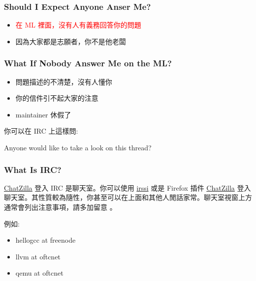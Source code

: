 \documentclass[CJK]{beamer}
\begin{document}
\begin{CJK}{UTF8}{bkai}
\begin{frame}
\end{frame}

\begin{frame}
  \frametitle{Should I Expect Anyone Anser Me?}

\begin{itemize}
  \item \textcolor{red}{在 ML 裡面，沒有人有義務回答你的問題}
  \item 因為大家都是志願者，你不是他老闆
\end{itemize}

\end{frame}

\begin{frame}
  \frametitle{What If Nobody Answer Me on the ML?}

\begin{itemize}
  \item 問題描述的不清楚，沒有人懂你
  \item 你的信件引不起大家的注意
  \item maintainer 休假了
\end{itemize}

\medskip
你可以在 IRC 上這樣問:

  Anyone would like to take a look on this thread?

\end{frame}

\begin{frame}
  \frametitle{What Is IRC?}

\underline{\href{https://addons.mozilla.org/en-US/firefox/addon/chatzilla/}{ChatZilla}} 登入
IRC 是聊天室。你可以使用 \href{http://www.irssi.org/}{irssi} 或是 Firefox 插件
\href{https://addons.mozilla.org/en-US/firefox/addon/chatzilla/}{ChatZilla} 登入
聊天室。其性質較為隨性，你甚至可以在上面和其他人閒話家常。聊天室視窗上方通常會列出注意事項，請多加留意 。

\medskip

例如:
\begin{itemize}
  \item hellogcc at freenode
  \item llvm at oftcnet
  \item qemu at oftcnet
\end{itemize}
\end{frame}


\end{CJK}
\end{document}
